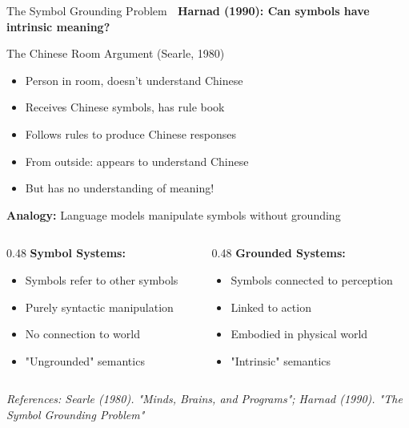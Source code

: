 \documentclass[aspectratio=169]{beamer}
\begin{document}
\begin{frame}[shrink=10]{The Symbol Grounding Problem 🔗}
\textbf{Harnad (1990): Can symbols have intrinsic meaning?}

\vspace{1em}

\begin{exampleblock}{The Chinese Room Argument (Searle, 1980)}
\begin{itemize}\setlength{\itemsep}{0pt}
    \item Person in room, doesn't understand Chinese
    \item Receives Chinese symbols, has rule book
    \item Follows rules to produce Chinese responses
    \item From outside: appears to understand Chinese
    \item But has no understanding of meaning!
\end{itemize}

\vspace{0.5em}
\textbf{Analogy:} Language models manipulate symbols without grounding
\end{exampleblock}

\vspace{1em}

\begin{columns}[T]
\begin{column}{0.48\textwidth}
\textbf{Symbol Systems:}
\begin{itemize}\setlength{\itemsep}{0pt}
    \item Symbols refer to other symbols
    \item Purely syntactic manipulation
    \item No connection to world
    \item "Ungrounded" semantics
\end{itemize}
\end{column}

\begin{column}{0.48\textwidth}
\textbf{Grounded Systems:}
\begin{itemize}\setlength{\itemsep}{0pt}
    \item Symbols connected to perception
    \item Linked to action
    \item Embodied in physical world
    \item "Intrinsic" semantics
\end{itemize}
\end{column}
\end{columns}

\vspace{0.5em}
\small
\textit{References: Searle (1980). "Minds, Brains, and Programs"; Harnad (1990). "The Symbol Grounding Problem"}
\end{frame}
\end{document}
